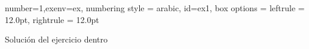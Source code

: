 \begin{SolutionAfter}{number=1,exenv=ex, numbering style = arabic, id=ex1, box options = {leftrule = 12.0pt, rightrule = 12.0pt} }


Solución del ejercicio dentro

\end{SolutionAfter}
